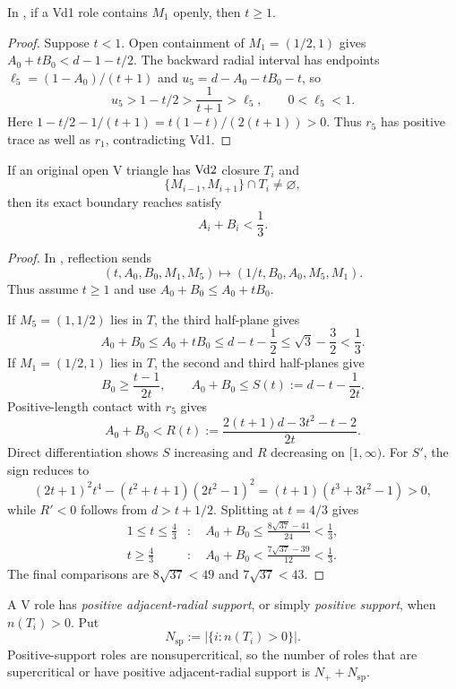 \begin{lemma}
\label{lem:vd1-forward-orientation}
In , if a Vd1 role contains $M_1$
openly, then $t\ge1$.
\end{lemma}
\begin{proof}
Suppose $t<1$. Open containment of $M_1=(1/2,1)$ gives
$A_0+tB_0<d-1-t/2$. The backward radial interval has endpoints
$\ell_5=(1-A_0)/(t+1)$ and $u_5=d-A_0-tB_0-t$, so
\[
 u_5>1-t/2>\frac1{t+1}>\ell_5,
 \qquad 0<\ell_5<1.
\]
Here $1-t/2-1/(t+1)=t(1-t)/(2(t+1))>0$.
Thus $r_5$ has positive trace as well as $r_1$, contradicting Vd1.
\end{proof}

\begin{lemma}
\label{lem:vd2-neighbor-midpoint-cap}
If an original open V triangle has $\mathrm{Vd2}$ closure $T_i$ and
\[
 \{M_{i-1},M_{i+1}\}\cap T_i\ne\varnothing,
\]
then its exact boundary reaches satisfy
\[
 A_i+B_i<\frac13.
\]
\end{lemma}

\begin{proof}
In , reflection sends
\[
 (t,A_0,B_0,M_1,M_5)
 \longmapsto(1/t,B_0,A_0,M_5,M_1).
\]
Thus assume $t\ge1$ and use $A_0+B_0\le A_0+tB_0$.

If $M_5=(1,1/2)$ lies in $T$, the third half-plane gives
\[
 A_0+B_0\le A_0+tB_0
 \le d-t-\frac12\le\sqrt3-\frac32<\frac13.
\]
If $M_1=(1/2,1)$ lies in $T$, the second and third half-planes give
\[
 B_0\ge\frac{t-1}{2t},
 \qquad A_0+B_0\le S(t):=d-t-\frac1{2t}.
\]
Positive-length contact with $r_5$ gives
\[
 A_0+B_0<R(t):=\frac{2(t+1)d-3t^2-t-2}{2t}.
\]
Direct differentiation shows $S$ increasing and $R$ decreasing on
$[1,\infty)$.  For $S'$, the sign reduces to
\[
 (2t+1)^2t^4-(t^2+t+1)(2t^2-1)^2
 =(t+1)(t^3+3t^2-1)>0,
\]
while $R'<0$ follows from $d>t+1/2$.  Splitting at $t=4/3$ gives
\[
\begin{aligned}
1\le t\le\frac43&:\quad
A_0+B_0\le\frac{8\sqrt{37}-41}{24}<\frac13,\\
t\ge\frac43&:\quad
A_0+B_0<\frac{7\sqrt{37}-39}{12}<\frac13.
\end{aligned}
\]
The final comparisons are $8\sqrt{37}<49$ and $7\sqrt{37}<43$.
\end{proof}

A V role has \emph{positive adjacent-radial support}, or simply
\emph{positive support}, when $n(T_i)>0$. Put
\[
 N_{\mathrm{sp}}:=|\{i:n(T_i)>0\}|.
\]
Positive-support roles are nonsupercritical, so the number of roles that
are supercritical or have positive adjacent-radial support is
$N_++N_{\mathrm{sp}}$.




